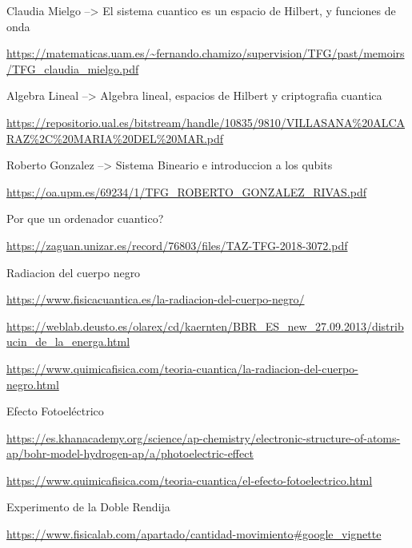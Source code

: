 \documentclass{article}
\numberwithin{equation}{section} %
\begin{document}
        Claudia Mielgo --> El sistema cuantico es un espacio de Hilbert, y funciones de onda\par
        \url{https://matematicas.uam.es/~fernando.chamizo/supervision/TFG/past/memoirs/TFG_claudia_mielgo.pdf}
        \vspace{2mm}

        Algebra Lineal --> Algebra lineal, espacios de Hilbert y criptografia cuantica\par
        \url{https://repositorio.ual.es/bitstream/handle/10835/9810/VILLASANA%20ALCARAZ%2C%20MARIA%20DEL%20MAR.pdf}
        \vspace{2mm}

        Roberto Gonzalez --> Sistema Bineario e introduccion a los qubits\par
        \url{https://oa.upm.es/69234/1/TFG_ROBERTO_GONZALEZ_RIVAS.pdf}
        \vspace{2mm}

        Por que un ordenador cuantico?\par
        \url{https://zaguan.unizar.es/record/76803/files/TAZ-TFG-2018-3072.pdf}
        \vspace{2mm}

        Radiacion del cuerpo negro\par
        \url{https://www.fisicacuantica.es/la-radiacion-del-cuerpo-negro/}
        \vspace{2mm}

        \url{https://weblab.deusto.es/olarex/cd/kaernten/BBR_ES_new_27.09.2013/distribucin_de_la_energa.html}
        \vspace{2mm}

        \url{https://www.quimicafisica.com/teoria-cuantica/la-radiacion-del-cuerpo-negro.html}
        \vspace{2mm}

        Efecto Fotoeléctrico\par
        \url{https://es.khanacademy.org/science/ap-chemistry/electronic-structure-of-atoms-ap/bohr-model-hydrogen-ap/a/photoelectric-effect}
        \vspace{2mm}

        \url{https://www.quimicafisica.com/teoria-cuantica/el-efecto-fotoelectrico.html}
        \vspace{2mm}

        Experimento de la Doble Rendija\par
        \url{https://www.fisicalab.com/apartado/cantidad-movimiento#google_vignette}
        \vspace{2mm}
\end{document}
